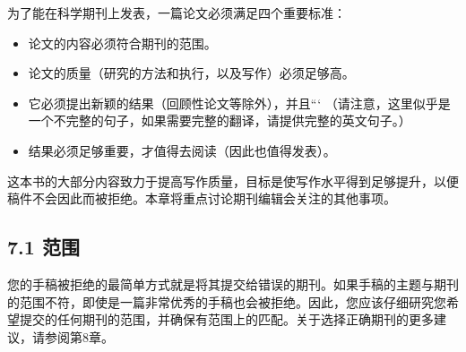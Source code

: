 为了能在科学期刊上发表，一篇论文必须满足四个重要标准：

\begin{itemize}
\item 论文的内容必须符合期刊的范围。
\item 论文的质量（研究的方法和执行，以及写作）必须足够高。
\item 它必须提出新颖的结果（回顾性论文等除外），并且``` 
（请注意，这里似乎是一个不完整的句子，如果需要完整的翻译，请提供完整的英文句子。）
\item 结果必须足够重要，才值得去阅读（因此也值得发表）。
\end{itemize}

这本书的大部分内容致力于提高写作质量，目标是使写作水平得到足够提升，以便稿件不会因此而被拒绝。本章将重点讨论期刊编辑会关注的其他事项。

\subsection*{7.1 范围}
您的手稿被拒绝的最简单方式就是将其提交给错误的期刊。如果手稿的主题与期刊的范围不符，即使是一篇非常优秀的手稿也会被拒绝。因此，您应该仔细研究您希望提交的任何期刊的范围，并确保有范围上的匹配。关于选择正确期刊的更多建议，请参阅第8章。

